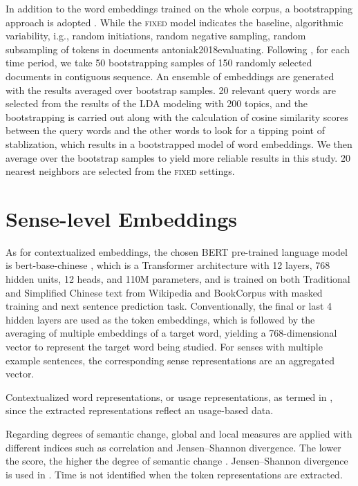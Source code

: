 In addition to the word embeddings trained on the whole corpus, a bootstrapping approach is adopted \parencite{antoniak2018evaluating}. While the \textsc{fixed} model indicates the baseline, algorithmic variability, i.g., random initiations, random negative sampling, random subsampling of tokens in documents {antoniak2018evaluating}. Following \textcite{antoniak2018evaluating}, for each time period, we take 50 bootstrapping samples of 150 randomly selected documents in contiguous sequence. An ensemble of embeddings are generated with the results averaged over bootstrap samples. 20 relevant query words are selected from the results of the LDA modeling with 200 topics, and the bootstrapping is carried out along with the calculation of cosine similarity scores between the query words and the other words to look for a tipping point of stablization, which results in a bootstrapped model of word embeddings. We then average over the bootstrap samples to yield more reliable results in this study. 20 nearest neighbors are selected from the \textsc{fixed} settings. 


\section{Sense-level Embeddings}
As for contextualized embeddings, the chosen BERT pre-trained language model is bert-base-chinese \parencite{devlin2018bert}, which is a Transformer architecture with 12 layers, 768 hidden units, 12 heads, and 110M parameters, and is trained on both Traditional and Simplified Chinese text from Wikipedia and BookCorpus with masked training and next sentence prediction task. Conventionally, the final or last 4 hidden layers are used as the token embeddings, which is followed by the averaging of multiple embeddings of a target word, yielding a 768-dimensional vector to represent the target word being studied. For senses with multiple example sentences, the corresponding sense representations are an aggregated vector.

Contextualized word representations, or usage representations, as termed in \parencite{giulianelli2019lexical}, since the extracted representations reflect an usage-based data.

Regarding degrees of semantic change, global and local measures are applied with different indices such as correlation and Jensen–Shannon divergence. The lower the score, the higher the degree of semantic change \parencite{hamilton2016law}. Jensen–Shannon divergence is used in \textcite{giulianelli2019lexical}. Time is not identified when the token representations are extracted.

